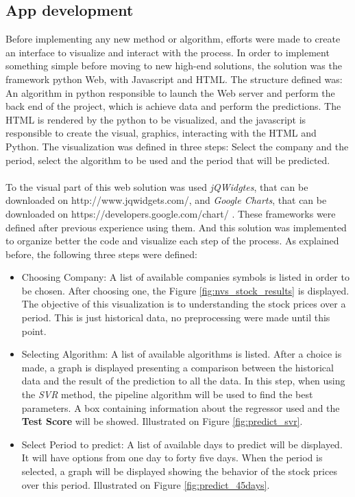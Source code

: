 \subsection{App development}
Before implementing any new method or algorithm, efforts were made to create an interface to visualize and interact with the process. In order to implement something simple
before moving to new high-end solutions, the solution was the framework python Web, with Javascript and HTML. The structure defined was: An algorithm in python responsible to launch the
Web server and perform the back end of the project, which is achieve data and perform the predictions. The HTML is rendered by the python to be visualized, and the javascript is responsible
to create the visual, graphics, interacting with the HTML and Python. The visualization was defined in three steps: Select the company and the period, select the algorithm to be used and the period
that will be predicted.\\
\\
To the visual part of this web solution was used \textit{jQWidgtes}, that can be downloaded on http://www.jqwidgets.com/, and \textit{Google Charts}, that can be downloaded on https://developers.google.com/chart/ .
These frameworks were defined after previous experience using them. And this solution was implemented to organize better the code and visualize each step of the process. As explained before, the
following three steps were defined:
\begin{itemize}
 \item Choosing Company: A list of available companies symbols is listed in order to be chosen. After choosing one, the Figure \ref{fig:nvs_stock_results} is displayed. The objective of this
 visualization is to understanding the stock prices over a period. This is just historical data, no preprocessing were made until this point. 
 \item Selecting Algorithm: A list of available algorithms is listed. After a choice is made, a graph is displayed presenting a comparison between the historical data and the result of the 
 prediction to all the data. In this step, when using the \textit{SVR} method, the pipeline algorithm will be used to find the best parameters. A box containing information about the regressor
 used and the \textbf{Test Score} will be showed. Illustrated on Figure \ref{fig:predict_svr}.
 \item Select Period to predict: A list of available days to predict will be displayed. It will have options from one day to forty five days. When the period is selected, a graph will be displayed
 showing the behavior of the stock prices over this period. Illustrated on Figure \ref{fig:predict_45days}.
\end{itemize}